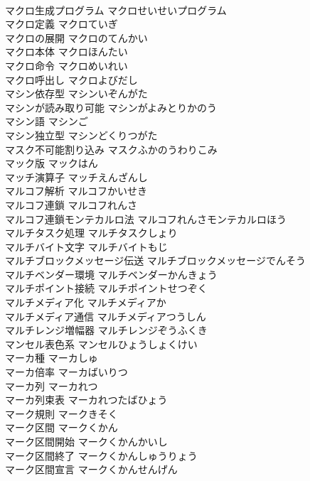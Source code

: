 \documentclass[8pt]{extreport}
\begin{document}
\begin{CJK}{UTF8}{min}
\\	マクロ生成プログラム	マクロせいせいプログラム	
\\	マクロ定義	マクロていぎ	
\\	マクロの展開	マクロのてんかい	
\\	マクロ本体	マクロほんたい	
\\	マクロ命令	マクロめいれい	
\\	マクロ呼出し	マクロよびだし	
\\	マシン依存型	マシンいぞんがた	
\\	マシンが読み取り可能	マシンがよみとりかのう	
\\	マシン語	マシンご	
\\	マシン独立型	マシンどくりつがた	
\\	マスク不可能割り込み	マスクふかのうわりこみ	
\\	マック版	マックはん	
\\	マッチ演算子	マッチえんざんし	
\\	マルコフ解析	マルコフかいせき	
\\	マルコフ連鎖	マルコフれんさ	
\\	マルコフ連鎖モンテカルロ法	マルコフれんさモンテカルロほう	
\\	マルチタスク処理	マルチタスクしょり	
\\	マルチバイト文字	マルチバイトもじ	
\\	マルチブロックメッセージ伝送	マルチブロックメッセージでんそう	
\\	マルチベンダー環境	マルチベンダーかんきょう	
\\	マルチポイント接続	マルチポイントせつぞく	
\\	マルチメディア化	マルチメディアか	
\\	マルチメディア通信	マルチメディアつうしん	
\\	マルチレンジ増幅器	マルチレンジぞうふくき	
\\	マンセル表色系	マンセルひょうしょくけい	
\\	マーカ種	マーカしゅ	
\\	マーカ倍率	マーカばいりつ	
\\	マーカ列	マーカれつ	
\\	マーカ列束表	マーカれつたばひょう	
\\	マーク規則	マークきそく	
\\	マーク区間	マークくかん	
\\	マーク区間開始	マークくかんかいし	
\\	マーク区間終了	マークくかんしゅうりょう	
\\	マーク区間宣言	マークくかんせんげん	

\end{CJK}
\end{document}
